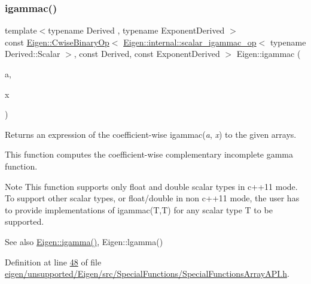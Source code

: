 \subsubsection{\texorpdfstring{igammac()}{igammac()}}
{\footnotesize\ttfamily template$<$typename Derived , typename Exponent\+Derived $>$ \\
const \hyperlink{group___core___module_class_eigen_1_1_cwise_binary_op}{Eigen\+::\+Cwise\+Binary\+Op}$<$ \hyperlink{struct_eigen_1_1internal_1_1scalar__igammac__op}{Eigen\+::internal\+::scalar\+\_\+igammac\+\_\+op}$<$ typename Derived\+::\+Scalar $>$, const Derived, const Exponent\+Derived $>$ Eigen\+::igammac (\begin{DoxyParamCaption}\item[{const \hyperlink{group___core___module_class_eigen_1_1_array_base}{Eigen\+::\+Array\+Base}$<$ Derived $>$ \&}]{a,  }\item[{const \hyperlink{group___core___module_class_eigen_1_1_array_base}{Eigen\+::\+Array\+Base}$<$ Exponent\+Derived $>$ \&}]{x }\end{DoxyParamCaption})\hspace{0.3cm}{\ttfamily [inline]}}

\begin{DoxyReturn}{Returns}
an expression of the coefficient-\/wise igammac({\itshape a}, {\itshape x}) to the given arrays.
\end{DoxyReturn}
This function computes the coefficient-\/wise complementary incomplete gamma function.

\begin{DoxyNote}{Note}
This function supports only float and double scalar types in c++11 mode. To support other scalar types, or float/double in non c++11 mode, the user has to provide implementations of igammac(\+T,\+T) for any scalar type T to be supported.
\end{DoxyNote}
\begin{DoxySeeAlso}{See also}
\hyperlink{namespace_eigen_af5aa651137636b1cdbd27de1cfe91148}{Eigen\+::igamma()}, Eigen\+::lgamma() 
\end{DoxySeeAlso}


Definition at line \hyperlink{eigen_2unsupported_2_eigen_2src_2_special_functions_2_special_functions_array_a_p_i_8h_source_l00048}{48} of file \hyperlink{eigen_2unsupported_2_eigen_2src_2_special_functions_2_special_functions_array_a_p_i_8h_source}{eigen/unsupported/\+Eigen/src/\+Special\+Functions/\+Special\+Functions\+Array\+A\+P\+I.\+h}.

\mbox{\label{namespace_eigen_a820c0e0460934cc17eb6dacbad54a9f5}} 
